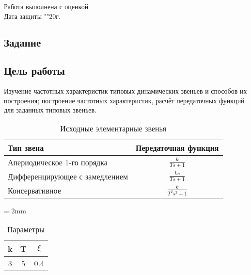 \documentclass[a4paper, 11pt]{article}
\begin{document}
\begin{titlepage}
		Работа выполнена с оценкой \hspace{1cm} \underline{\hspace{8cm}} \\ 
		\vspace{1cm}
		Дата защиты "\underline{\hspace{0.7cm}}"\hspace{0.2cm}\underline{\hspace{2cm}}\hspace{0.2cm}20\underline{\hspace{0.7cm}}г.

\end{titlepage}

\begin{center}
\section*{Задание}
\end{center}

\subsection*{Цель работы} 
\par
Изучение частотных характеристик типовых динамических звеньев и способов их построения; построение частотных характеристик, расчёт передаточных функций для заданных типовых звеньев.

\begin{table}[h!]

    \begin{threeparttable}
    	\caption{Исходные элементарные звенья}
    	\begin{tabular} {|l|c|}
        \hline
        	Тип звена & Передаточная функция \\ [0.5cm]  \hline
        	Апериодическое 1-го порядка & $\displaystyle\frac{k}{Ts + 1}$ \\ [0.5cm]  \hline
        	Дифференцирующее с замедлением & $\displaystyle\frac{ks}{Ts + 1}$ \\ [0.5cm]  \hline
        	Консервативное & $\displaystyle\frac{k}{T^2s^2+1}$ \\ [0.5cm] \hline
    	\end{tabular}
    \end{threeparttable} 
\end{table}

\begin{table}[h!]
    \tabulinesep = 2mm
    	\caption{Параметры}\label{tab:perflogcross}
    	\begin{tabular}{|c|c|c|}
    		\hline
        	k & T & $\xi$ \\ \hline
        	3 & 5 & 0.4 \\
        	\hline
    	\end{tabular}
\end{table}
\end{document}

